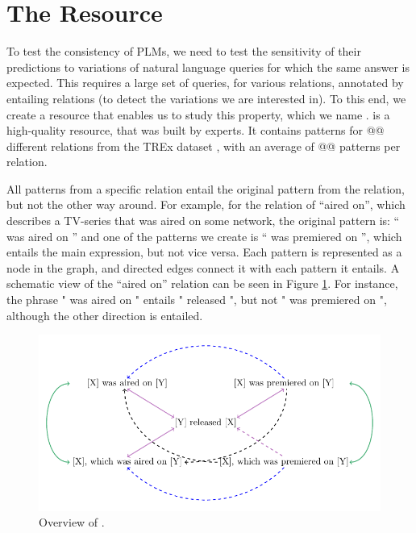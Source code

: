 \section{The \resource{} Resource}
\label{sec:rel-graph}


To test the consistency of PLMs, we need to test the sensitivity of their predictions to variations of natural language queries for which the same answer is expected.  This requires a large set of queries, for various relations, annotated by entailing relations (to detect the variations we are interested in). To this end, we create a resource that enables us to study this property, which we name \resource{}. \resource{} is a high-quality resource, that was built by experts. %
It contains patterns for @@ different relations from the TREx dataset \cite{trex}, with an average of @@ patterns per relation.

All patterns from a specific relation entail the original pattern from the relation, but not the other way around.
For example, for the relation of ``aired on'', which describes a TV-series that was aired on some network, the original pattern is: ``\subj{} was aired on \obj{}'' and one of the patterns we create is ``\subj{} was premiered on \obj{}'', which entails the main expression, but not vice versa.
Each pattern is represented as a node in the graph, and directed edges connect it with each pattern it entails.
A schematic view of the ``aired on'' relation can be seen in Figure \ref{fig:graph}. For instance, the phrase "\subj{} was aired on \obj{}" entails "\obj{} released \subj{}", but not "\subj{} was premiered on \obj{}", although the other direction is entailed.

\begin{figure}[t!]
\centering

\includegraphics[width=1.\columnwidth]{figures/ent_graph}

\caption{Overview of \resource{}.}
\label{fig:graph}
\end{figure}

